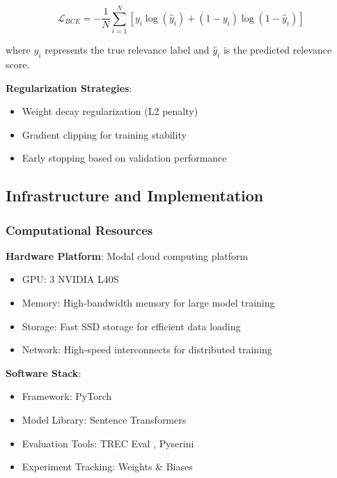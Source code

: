 \begin{equation}
\mathcal{L}_{BCE} = -\frac{1}{N} \sum_{i=1}^{N} [y_i \log(\hat{y}_i) + (1-y_i) \log(1-\hat{y}_i)]
\end{equation}

where $y_i$ represents the true relevance label and $\hat{y}_i$ is the predicted relevance score.

\textbf{Regularization Strategies}:
\begin{itemize}
    \item Weight decay regularization (L2 penalty)
    \item Gradient clipping for training stability
    \item Early stopping based on validation performance
\end{itemize}

\subsection{Infrastructure and Implementation}

\subsubsection{Computational Resources}

\textbf{Hardware Platform}: Modal cloud computing platform \cite{modal_labs}
\begin{itemize}
    \item GPU: 3 NVIDIA L40S
    \item Memory: High-bandwidth memory for large model training
    \item Storage: Fast SSD storage for efficient data loading
    \item Network: High-speed interconnects for distributed training
\end{itemize}

\textbf{Software Stack}:
\begin{itemize}
    \item Framework: PyTorch \cite{paszke2019pytorchimperativestylehighperformance}
    \item Model Library: Sentence Transformers \cite{reimers2019sentence}
    \item Evaluation Tools: TREC Eval \cite{trec_eval_github}, Pyserini \cite{lin2021pyserini}
    \item Experiment Tracking: Weights \& Biases \cite{wandb2020}
\end{itemize}

